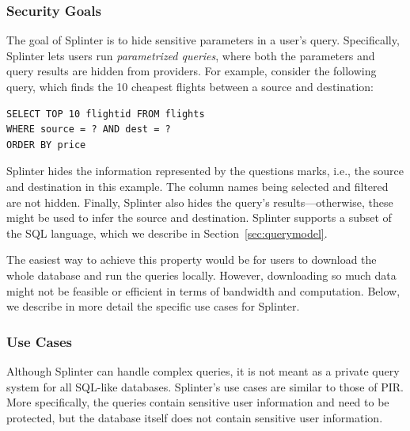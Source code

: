 \subsubsection{Security Goals}
\label{sec:query_model}
The goal of Splinter is to hide sensitive parameters in
a user's query.
Specifically, Splinter lets users run \emph{parametrized queries}, 
where both the parameters and query results are hidden from providers.
For example, consider the following query, which finds the 10 cheapest flights between a source and destination:
\begin{verbatim}
SELECT TOP 10 flightid FROM flights
WHERE source = ? AND dest = ? 
ORDER BY price
\end{verbatim}
Splinter hides the information represented by the questions marks, i.e.,
the source and destination in this example.
The column names being selected and filtered are not hidden.
Finally, Splinter also hides the query's results---otherwise,
these might be used to infer the source and destination. 
Splinter supports a subset of the SQL language, which we describe in Section~\ref{sec:querymodel}.

The easiest way to achieve this property would be for users to download the whole database
and run the queries locally. However, downloading so much data might not 
be feasible or efficient in terms of bandwidth and computation. Below,
we describe in more detail the specific use cases for Splinter.

\subsubsection{Use Cases}
\label{sec:splinter_cases}
Although Splinter can handle complex queries, it is not
meant as a private query system for all SQL-like databases.
Splinter's use cases are similar to those of PIR. More specifically,
the queries contain sensitive user information and need to be 
protected, but the database itself does not contain
sensitive user information.

